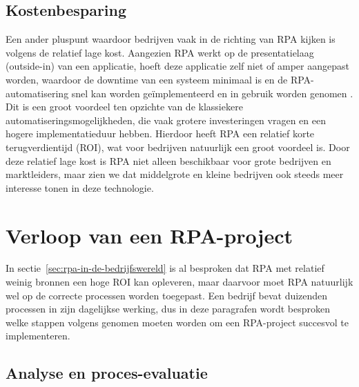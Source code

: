 \subsection{Kostenbesparing}
\label{subsec:kostenbesparing}

Een ander pluspunt waardoor bedrijven vaak in de richting van RPA kijken is volgens \textcite{Fernandez2021} de relatief lage kost. Aangezien RPA werkt op de presentatielaag (outside-in) van een applicatie, hoeft deze applicatie zelf niet of amper aangepast worden, waardoor de downtime van een systeem minimaal is en de RPA-automatisering snel kan worden geïmplementeerd en in gebruik worden genomen \autocite{Asquith2019}. Dit is een groot voordeel ten opzichte van de klassiekere automatiseringsmogelijkheden, die vaak grotere investeringen vragen en een hogere implementatieduur hebben. 
Hierdoor heeft RPA een relatief korte terugverdientijd (ROI), wat voor bedrijven natuurlijk een groot voordeel is.
Door deze relatief lage kost is RPA niet alleen beschikbaar voor grote bedrijven en marktleiders, maar zien we dat middelgrote en kleine bedrijven ook steeds meer interesse tonen in deze technologie.

\section{Verloop van een RPA-project}
\label{sec:verloop-van-een-rpa-project}

In sectie~\ref{sec:rpa-in-de-bedrijfswereld} is al besproken dat RPA met relatief weinig bronnen een hoge ROI kan opleveren, maar daarvoor moet RPA natuurlijk wel op de correcte processen worden toegepast.
Een bedrijf bevat duizenden processen in zijn dagelijkse werking, dus in deze paragrafen wordt besproken welke stappen volgens \textcite{El-Gharib2023} genomen moeten worden om een RPA-project succesvol te implementeren.

\subsection{Analyse en proces-evaluatie}
\label{subsec:analyse-en-proces-evaluatie}

